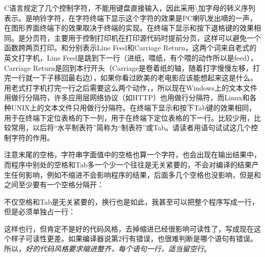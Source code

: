 C语言规定了几个控制字符，不能用键盘直接输入，因此采用\textbackslash{}加字母的转义序列表示。是响铃字符，在字符终端下显示这个字符的效果是PC喇叭发出嘀的一声，在图形界面终端下的效果取决于终端的实现。在终端下显示和按下退格键的效果相同。是分页符，主要用于控制打印机在打印源代码时提前分页，这样可以避免一个函数跨两页打印。和分别表示Line Feed和Carriage Return，这两个词来自老式的英文打字机，Line Feed是跳到下一行（进纸，喂纸，有个喂的动作所以是feed），Carriage Return是回到本行开头（Carriage是卷着纸的轴，随着打字慢慢左移，打完一行就一下子移回最右边），如果你看过欧美的老电影应该能想起来这是什么。用老式打字机打完一行之后需要这么两个动作，，所以现在Windows上的文本文件用做行分隔符，许多应用层网络协议（如HTTP）也用做行分隔符，而Linux和各种UNIX上的文本文件只用做行分隔符。在终端下显示和按下Tab键的效果相同，用于在终端下定位表格的下一列，用于在终端下定位表格的下一行。比较少用，比较常用，以后将“水平制表符”简称为“制表符”或Tab。请读者用语句试试这几个控制字符的作用。



注意末尾的空格，字符串字面值中的空格也算一个字符，也会出现在输出结果中，而程序中别处的空格和Tab多一个少一个往往是无关紧要的，不会对编译的结果产生任何影响，例如不缩进不会影响程序的结果，后面多几个空格也没影响，但是和之间至少要有一个空格分隔开：




不仅空格和Tab是无关紧要的，换行也是如此，我甚至可以把整个程序写成一行，但是必须单独占一行：




这样也行，但肯定不是好的代码风格，去掉缩进已经很影响可读性了，写成现在这个样子可读性更差。如果编译器说第2行有错误，也很难判断是哪个语句有错误。所以，\emph{好的代码风格要求缩进整齐，每个语句一行，适当留空行}。



